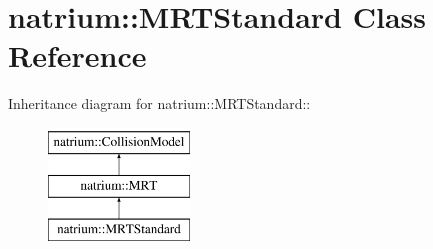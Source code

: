 \hypertarget{classnatrium_1_1MRTStandard}{
\section{natrium::MRTStandard Class Reference}
\label{classnatrium_1_1MRTStandard}
}
Inheritance diagram for natrium::MRTStandard::\begin{figure}[H]
\begin{center}
\leavevmode
\includegraphics[height=3cm]{classnatrium_1_1MRTStandard}
\end{center}
\end{figure}
